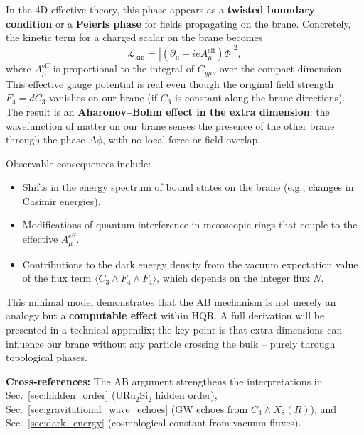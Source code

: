 In the 4D effective theory, this phase appears as a \textbf{twisted boundary condition} or a \textbf{Peierls phase}
for fields propagating on the brane. Concretely, the kinetic term for a charged scalar on the brane becomes
\[
\mathcal{L}_{\text{kin}} = |(\partial_\mu - i e A_\mu^{\text{eff}})\Phi|^2,
\]
where $A_\mu^{\text{eff}}$ is proportional to the integral of $C_{y\mu\nu}$ over the compact dimension.
This effective gauge potential is real even though the original field strength $F_4 = dC_3$ vanishes on our brane
(if $C_3$ is constant along the brane directions). The result is an \textbf{Aharonov–Bohm effect in the extra dimension}:
the wavefunction of matter on our brane senses the presence of the other brane through the phase $\Delta \phi$,
with no local force or field overlap.

Observable consequences include:
\begin{itemize}
\item Shifts in the energy spectrum of bound states on the brane (e.g., changes in Casimir energies).
\item Modifications of quantum interference in mesoscopic rings that couple to the effective $A_\mu^{\text{eff}}$.
\item Contributions to the dark energy density from the vacuum expectation value of the flux term
  $\langle C_3 \wedge F_4 \wedge F_4 \rangle$, which depends on the integer flux $N$.
\end{itemize}
This minimal model demonstrates that the AB mechanism is not merely an analogy but a \textbf{computable effect}
within HQR. A full derivation will be presented in a technical appendix; the key point is that extra dimensions can influence our brane
without any particle crossing the bulk – purely through topological phases.

\noindent\textbf{Cross‑references:} 
The AB argument strengthens the interpretations in Sec.~\ref{sec:hidden_order} (URu$_2$Si$_2$ hidden order),
Sec.~\ref{sec:gravitational_wave_echoes} (GW echoes from $C_3\wedge X_8(R)$), and
Sec.~\ref{sec:dark_energy} (cosmological constant from vacuum fluxes).